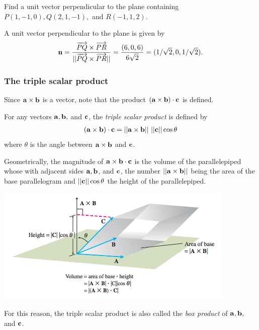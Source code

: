 \documentclass[12pt,letterpaper,reqno]{article}
\numberwithin{equation}{section}
\newcommand{\ti}[1]{\textit{#1}}
\begin{document}
\begin{exercise}
Find a unit vector perpendicular to the plane containing $P(1,-1,0), Q(2,1,-1),$ and $R(-1,1,2)$.	
\end{exercise}

{\color{red} 
A unit vector perpendicular to the plane is given by
\begin{align*}
	{\bf n}=\frac{\overrightarrow{PQ} \times \overrightarrow{PR}}{||\overrightarrow{PQ} \times \overrightarrow{PR}||}=\frac{(6,0,6)}{6\sqrt{2}}=(1/\sqrt{2},0,1/\sqrt{2}).
\end{align*}}

\subsubsection{The triple scalar product}
Since ${\bf a} \times {\bf b}$ is a vector, note that the product $({\bf a} \times {\bf b}) \cdot {\bf c}$ is defined.

\begin{defn}
	For any vectors ${\bf a}, {\bf b},$ and ${\bf c}$, the \ti{triple scalar product} is defined by
	\begin{align*}
		({\bf a} \times {\bf b}) \cdot {{\bf c}}=||{\bf a} \times {\bf b}|| \ ||{\bf c}|| \cos \theta
	\end{align*}
where $\theta$ is the angle between ${\bf a} \times {\bf b}$ and ${\bf c}$.
\end{defn}

Geometrically, the magnitude of ${\bf a} \times {\bf b} \cdot {{\bf c}}$ is the volume of the parallelepiped whose with adjacent sides ${\bf a}, {\bf b}$, and ${\bf c}$, the number $||{\bf a} \times {\bf b}||$ being the area of the base parallelogram and $||{\bf c}||\cos \theta$ the height of the parallelepiped.
\begin{center}
	\includegraphics[scale=0.5]{figures_mvc/triple_scalar_product_parallelepiped}
\end{center}
For this reason, the triple scalar product is also called the \ti{box product} of ${\bf a}, {\bf b},$ and ${\bf c}$.
\end{document}
